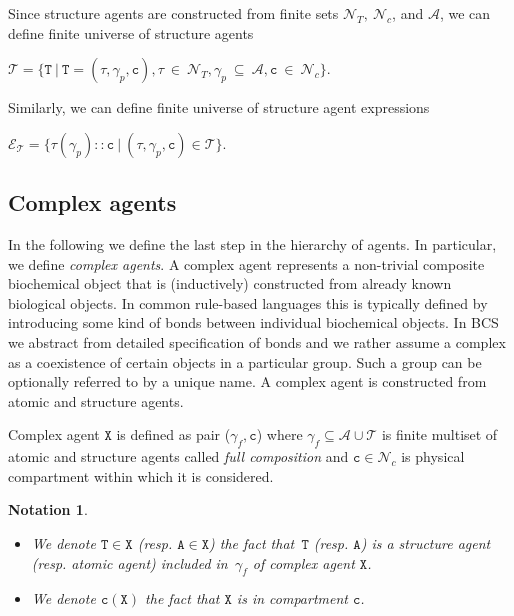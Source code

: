 \documentclass{entcs}
\renewcommand{\~}[0]{\texttildelow}
\newtheorem{notation}[thm]{Notation}
\begin{document}
\begin{theorem}
Since structure agents are constructed from finite sets $\mathcal{N}_{T},~\mathcal{N}_{c}$, and $\mathcal{A}$, we can define finite universe of structure agents

 $\mathcal{T} = \{ \mathtt{T}~|~\mathtt{T} = (\tau, \gamma_p, \mathtt{c}), \tau~\in~\mathcal{N}_{T}, \gamma_p~\subseteq~\mathcal{A},  \mathtt{c}~\in~\mathcal{N}_{c} \}$.

\noindent Similarly, we can define finite universe of structure agent expressions

 $\mathcal{E}_\mathcal{T} = \{ \tau(\gamma_p)::\mathtt{c} ~|~ (\tau, \gamma_p, \mathtt{c}) \in \mathcal{T} \}$.
\end{theorem}

\subsection{Complex agents}

In the following we define the last step in the hierarchy of agents. In particular, we define \textit{complex agents}. A complex agent represents a non-trivial composite biochemical object that is (inductively) constructed from already known biological objects. In common rule-based languages this is typically defined by introducing some kind of bonds between individual biochemical objects. In BCS we abstract from detailed specification of bonds and we rather assume a complex as a coexistence of certain objects in a particular group. Such a group can be optionally referred to by a unique name. A complex agent is constructed from atomic and structure agents.

\begin{defn}
Complex agent $\mathtt{X}$ is defined as pair ($\gamma_f, \mathtt{c}$) where $\gamma_f \subseteq \mathcal{A} \cup \mathcal{T}$ is finite multiset of atomic and structure agents called \emph{full composition} and $\mathtt{c} \in \mathcal{N}_{c}$ is physical compartment within which it is considered.
\end{defn}

\begin{notation}
~
\begin{itemize}
\item  We denote $\mathtt{T} \in \mathtt{X}$ (resp. $\mathtt{A}\in \mathtt{X}$) the fact that~$\mathtt{T}$ (resp. $\mathtt{A}$) is a structure agent (resp. atomic agent) included in~$\gamma_f$ of complex agent $\mathtt{X}$. 
\item We denote $\mathtt{c}(\mathtt{X})$ the fact that $\mathtt{X}$ is in compartment $\mathtt{c}$.
\end{itemize}
\end{notation}
\end{document}
